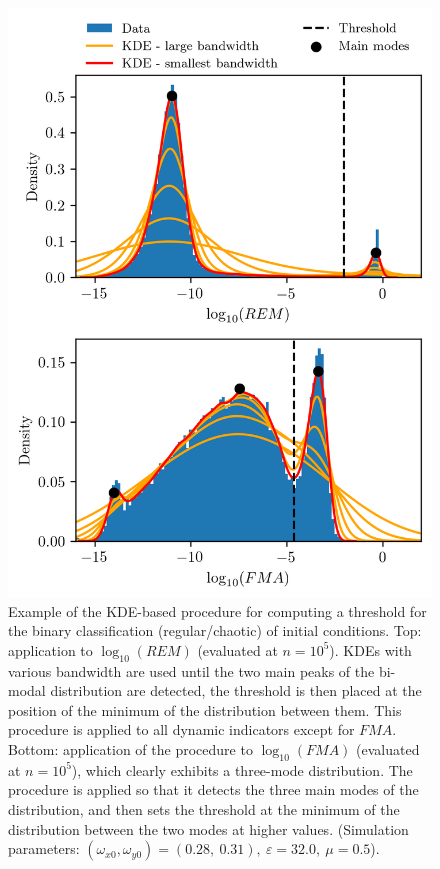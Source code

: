 \begin{figure}[htp]
    \centering
    \includegraphics[width=\columnwidth]{6_dynamic_indicators/figs/thresholds.png}
    \caption{Example of the KDE-based procedure for computing a threshold for the binary classification (regular/chaotic) of initial conditions. Top: application to $\log_{10}(REM)$ (evaluated at $n=10^5$). KDEs with various bandwidth are used until the two main peaks of the bi-modal distribution are detected, the threshold is then placed at the position of the minimum of the distribution between them. This procedure is applied to all dynamic indicators except for $FMA$. Bottom: application of the procedure to $\log_{10}(FMA)$ (evaluated at $n=10^5$), which clearly exhibits a three-mode distribution. The procedure is applied so that it detects the three main modes of the distribution, and then sets the threshold at the minimum of the distribution between the two modes at higher values. (Simulation parameters:  $(\omega_{x0},\omega_{y0})= (0.28,\ 0.31),\ \varepsilon=32.0,\ \mu=0.5$).}
    \label{fig:thresholds}
\end{figure}

